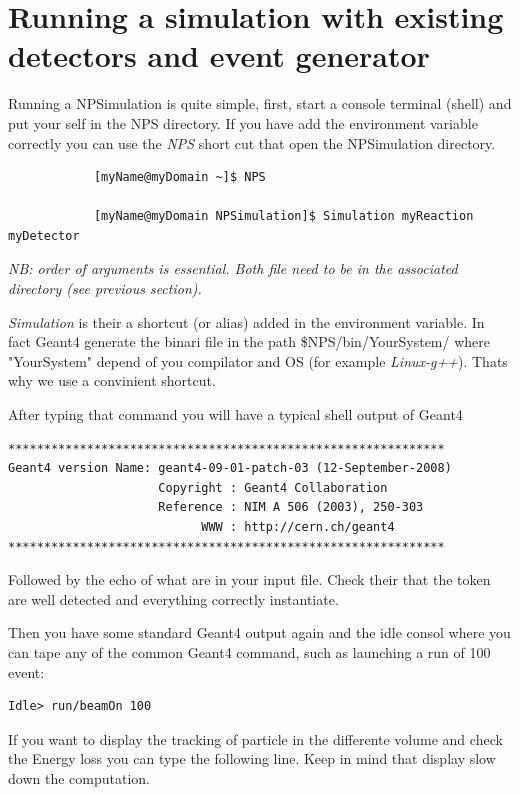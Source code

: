 \documentclass{book}
\begin{document}
\section{ Running a simulation with existing detectors and event generator }

Running a NPSimulation is quite simple, first, start a console terminal (shell) and put your self in the NPS directory.
If you have add the environment variable correctly you can use the \emph{NPS} short cut that open the NPSimulation directory.
	
	\begin{verbatim}
			[myName@myDomain ~]$ NPS
			
			[myName@myDomain NPSimulation]$ Simulation myReaction myDetector
	\end{verbatim}
	
\emph{NB: order of arguments is essential. Both file need to be in the associated directory (see previous section).}

\emph{Simulation} is their a shortcut (or alias) added in the environment variable. 
In fact Geant4 generate the binari file in the path \$NPS/bin/YourSystem/ where "YourSystem" depend of you compilator and OS (for example \emph{Linux-g++}). 
Thats why we use a convinient shortcut.

After typing that command you will have a typical shell output of Geant4
\begin{verbatim}
*************************************************************
Geant4 version Name: geant4-09-01-patch-03 (12-September-2008)
                     Copyright : Geant4 Collaboration
                     Reference : NIM A 506 (2003), 250-303
                           WWW : http://cern.ch/geant4
*************************************************************
\end{verbatim}

Followed by the echo of what are in your input file. 
Check their that the token are well detected and everything correctly instantiate.

Then you have some standard Geant4 output again and the idle consol where you can tape any of the common Geant4 command, such as launching a run of 100 event:
\begin{verbatim}
Idle> run/beamOn 100
\end{verbatim}

If you want to display the tracking of particle in the differente volume and check the Energy loss you can type the following line. 
Keep in mind that display slow down the computation.
\end{document}
